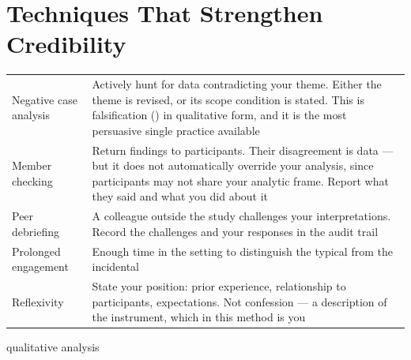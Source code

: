 \section{Techniques That Strengthen Credibility}

\begin{center}
\small
\begin{tabular}{@{}L{3.4cm}L{10.9cm}@{}}
\toprule
Negative case analysis
  & Actively hunt for data contradicting your theme. Either the theme is
    revised, or its scope condition is stated. This is falsification
    () in qualitative form, and it is the most persuasive
    single practice available \\
Member checking
  & Return findings to participants. Their disagreement is data --- but it does
    not automatically override your analysis, since participants may not share
    your analytic frame. Report what they said and what you did about it \\
Peer debriefing
  & A colleague outside the study challenges your interpretations. Record the
    challenges and your responses in the audit trail \\
Prolonged engagement
  & Enough time in the setting to distinguish the typical from the incidental \\
Reflexivity
  & State your position: prior experience, relationship to participants,
    expectations. Not confession --- a description of the instrument, which in
    this method is you \\
\bottomrule
\end{tabular}
\end{center}

\begin{traditions}{qualitative analysis}
\end{traditions}

